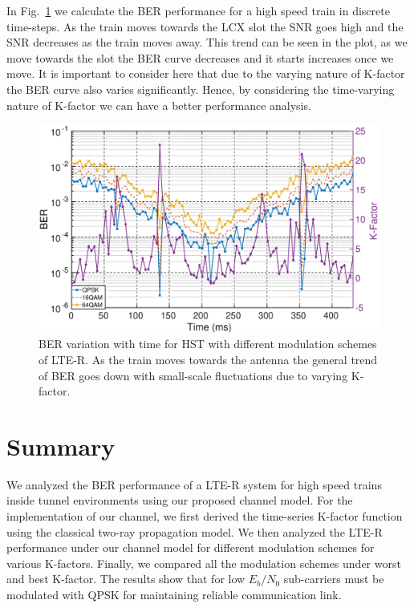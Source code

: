 In Fig.~\ref{kfactorber} we calculate the BER performance for a high speed train in discrete time-steps. As the train moves towards
the LCX slot the SNR goes high and the SNR decreases as the train moves away. This trend can be seen in the plot, as we move towards the slot the BER curve decreases and it starts increases once we move. It is important to consider here that due to the varying nature of K-factor the BER curve also varies significantly. Hence, by considering the time-varying nature of K-factor we can have a better performance analysis.

\begin{figure}[!ht]
\centering
\includegraphics[width=\textwidth,keepaspectratio]{images/Gill/lte_figs/kfactorcontinuous.eps} 
\caption{BER variation with time for HST with different modulation schemes of LTE-R. As the train moves towards
the antenna the general trend of BER goes down with small-scale fluctuations due to varying K-factor.}
\label{kfactorber}
\end{figure}

\section{Summary}
We analyzed the BER performance of a LTE-R system for high speed trains inside tunnel environments using our proposed channel model. For the implementation
of our channel, we first derived the time-series K-factor function using the classical two-ray propagation model. We then analyzed the LTE-R performance under our channel model for different modulation schemes for various K-factors. Finally, we compared all the modulation schemes under worst and best K-factor. The results show that for low $E_b/N_0$ sub-carriers must be modulated with QPSK for maintaining reliable communication link.

